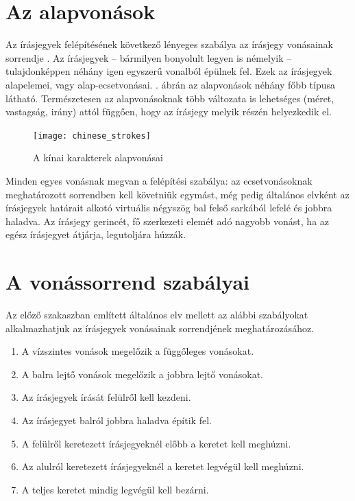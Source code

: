 \section{Az alapvonások}

Az írásjegyek felépítésének következő lényeges szabálya az írásjegy vonásainak sorrendje \cite{kinaiiras}. Az írásjegyek – bármilyen bonyolult legyen is némelyik – tulajdonképpen néhány igen egyszerű vonalból épülnek fel. Ezek az írásjegyek alapelemei, vagy alap-ecsetvonásai. . ábrán az alapvonások néhány főbb típusa látható. Természetesen az alapvonásoknak több változata is lehetséges (méret, vastagság, irány) attól függően, hogy az írásjegy melyik részén helyezkedik el.

\begin{figure}[h]
	\centering
	\texttt{[image: chinese\_strokes]}
	\caption{A kínai karakterek alapvonásai}
	\label{fig:alapvonasok}
\end{figure}

Minden egyes vonásnak megvan a felépítési szabálya: az ecsetvonásoknak meghatározott sorrendben kell követniük egymást, még pedig általános elvként az írásjegyek határait alkotó virtuális négyszög bal felső sarkából lefelé és jobbra haladva. Az írásjegy gerincét, fő szerkezeti elemét adó nagyobb vonást, ha az egész írásjegyet átjárja, legutoljára húzzák.

\section{A vonássorrend szabályai}

Az előző szakaszban említett általános elv mellett az alábbi szabályokat alkalmazhatjuk az írásjegyek vonásainak sorrendjének meghatározásához.
\begin{enumerate}
	\item A vízszintes vonások megelőzik a függőleges vonásokat.
	\item A balra lejtő vonások megelőzik a jobbra lejtő vonásokat. 
	\item Az írásjegyek írását felülről kell kezdeni. 
	\item Az írásjegyet balról jobbra haladva építik fel. 
	\item A felülről keretezett írásjegyeknél előbb a keretet kell meghúzni. 
	\item Az alulról keretezett írásjegyeknél a keretet legvégül kell meghúzni. 
	\item A teljes keretet mindig legvégül kell bezárni.
\end{enumerate}

